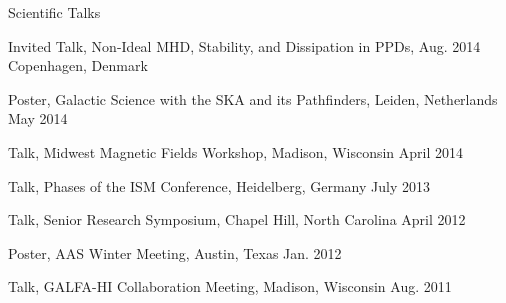 \documentclass{resume_clark} %
\begin{document}
\begin{rSection}{Scientific Talks}
\begin{etaremune}[itemsep=-1.8mm]
\item Invited Talk, Non-Ideal MHD, Stability, and Dissipation in PPDs, \hfill {Aug. 2014} \\ Copenhagen, Denmark 

\item Poster, Galactic Science with the SKA and its Pathfinders, Leiden, Netherlands \hfill {May 2014}

\item Talk, Midwest Magnetic Fields Workshop, Madison, Wisconsin \hfill {April 2014}

\item Talk, Phases of the ISM Conference, Heidelberg, Germany \hfill {July 2013}

\item Talk, Senior Research Symposium, Chapel Hill, North Carolina \hfill {April 2012}

\item Poster, AAS Winter Meeting, Austin, Texas \hfill {Jan. 2012}

\item Talk, GALFA-HI Collaboration Meeting, Madison, Wisconsin \hfill {Aug. 2011}


\end{etaremune}
\end{rSection}
\end{document}
